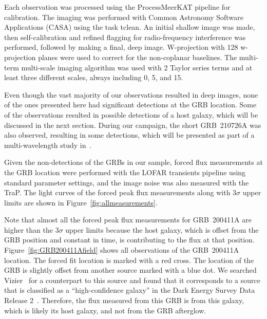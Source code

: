 \documentclass[12pt]{article}
\begin{document}
Each observation was processed using the ProcessMeerKAT pipeline \citep{pminprep} for calibration. The imaging was performed with Common Astronomy Software Applications (CASA) \citep{2022arXiv221002276T} using the task tclean. An initial shallow image was made, then self-calibration and refined flagging for radio-frequency interference was performed, followed by making a final, deep image. W-projection with 128 w-projection planes were used to correct for the non-coplanar baselines. The multi-term multi-scale imaging algorithm was used with 2 Taylor series terms and at least three different scales, always including 0, 5, and 15. 

Even though the vast majority of our observations resulted in deep images, none of the ones presented here had significant detections at the GRB location. Some of the observations resulted in possible detections of a host galaxy, which will be discussed in the next section. During our campaign, the short GRB~210726A was also observed, resulting in some detections, which will be presented as part of a multi-wavelength study in~\citep{grb210726ainprep}. 

Given the non-detections of the GRBs in our sample, forced flux measurements at the GRB location were performed with the LOFAR transients pipeline \citep[TraP;][]{2015A&C....11...25S} using standard parameter settings, and the image noise was also measured with the TraP. The light curves of the forced peak flux measurements along with $3\sigma$ upper limits are shown in Figure~\ref{fig:allmeasurements}. 

Note that almost all the forced peak flux measurements for GRB~200411A are higher than the $3\sigma$ upper limits because the host galaxy, which is offset from the GRB position and constant in time, is contributing to the flux at that position. Figure~\ref{fig:GRB200411Afield} shows all observations of the GRB~200411A location. The forced fit location is marked with a red cross. The location of the GRB is slightly offset from another source marked with a blue dot. We searched Vizier~\citep{vizier} for a counterpart to this source and found that it corresponds to a source that is classified as a ``high-confidence galaxy'' in the Dark Energy Survey Data Release 2~\citep{Abbott_2021}. Therefore, the flux measured from this GRB is from this galaxy, which is likely its host galaxy, and not from the GRB afterglow.
\end{document}
